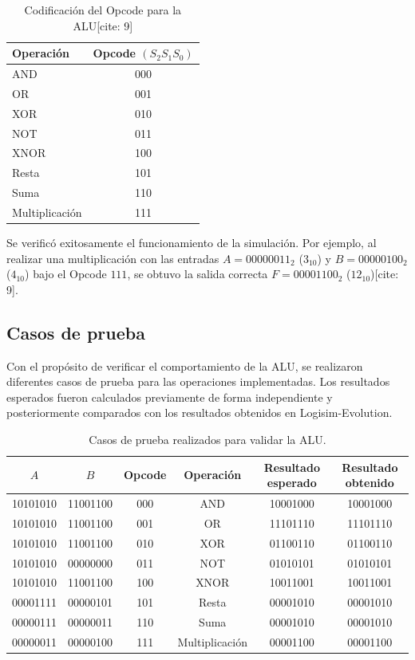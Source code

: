 \documentclass[12pt,a4paper]{article}
\begin{document}
\begin{table}[H]
    \centering
    \begin{tabular}{lc}
        \toprule
        \textbf{Operación} & \textbf{Opcode $(S_2 S_1 S_0)$} \\
        \midrule
        AND & 000 \\
        OR & 001 \\
        XOR & 010 \\
        NOT & 011 \\
        XNOR & 100 \\
        Resta & 101 \\
        Suma & 110 \\
        Multiplicación & 111 \\
        \bottomrule
    \end{tabular}
    \caption{Codificación del Opcode para la ALU[cite: 9]}
    \label{tab:opcode}
\end{table}

\noindent Se verificó exitosamente el funcionamiento de la simulación. Por ejemplo, al realizar una multiplicación con las entradas $A = 00000011_2$ ($3_{10}$) y $B = 00000100_2$ ($4_{10}$) bajo el Opcode $111$, se obtuvo la salida correcta $F = 00001100_2$ ($12_{10}$)[cite: 9].

\subsection{Casos de prueba}

Con el propósito de verificar el comportamiento de la ALU, se realizaron diferentes casos de prueba para las operaciones implementadas. Los resultados esperados fueron calculados previamente de forma independiente y posteriormente comparados con los resultados obtenidos en Logisim-Evolution.

\begin{table}[H]
    \centering
    \small
    \begin{tabular}{cccccc}
        \toprule
        $A$ & $B$ & Opcode & Operación & Resultado esperado & Resultado obtenido \\
        \midrule
        10101010 & 11001100 & 000 & AND & 10001000 & 10001000 \\
        10101010 & 11001100 & 001 & OR & 11101110 & 11101110 \\
        10101010 & 11001100 & 010 & XOR & 01100110 & 01100110 \\
        10101010 & 00000000 & 011 & NOT & 01010101 & 01010101 \\
        10101010 & 11001100 & 100 & XNOR & 10011001 & 10011001 \\
        00001111 & 00000101 & 101 & Resta & 00001010 & 00001010 \\
        00000111 & 00000011 & 110 & Suma & 00001010 & 00001010 \\
        00000011 & 00000100 & 111 & Multiplicación & 00001100 & 00001100 \\
        \bottomrule
    \end{tabular}
    \caption{Casos de prueba realizados para validar la ALU.}
    \label{tab:pruebas}
\end{table}
\end{document}
